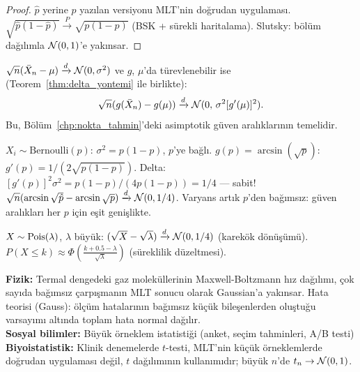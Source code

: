 \begin{proof}
$\hat{p}$ yerine $p$ yazılan versiyonu MLT'nin doğrudan uygulaması.
$\sqrt{\hat{p}(1-\hat{p})} \xrightarrow{P} \sqrt{p(1-p)}$ (BSK + sürekli haritalama).
Slutsky: bölüm dağılımla $\mathcal{N}(0,1)$'e yakınsar.
\end{proof}

\begin{teorem}
\label{thm:delta_mlt}
$\sqrt{n}(\bar{X}_n - \mu) \xrightarrow{d} \mathcal{N}(0,\sigma^2)$ ve $g$, $\mu$'da türevlenebilir ise
(Teorem~\ref{thm:delta_yontemi} ile birlikte):
\[
  \sqrt{n}(g(\bar{X}_n) - g(\mu)) \xrightarrow{d} \mathcal{N}(0,\, \sigma^2[g'(\mu)]^2).
\]
Bu, Bölüm~\ref{chp:nokta_tahmin}'deki asimptotik güven aralıklarının temelidir.
\end{teorem}

\begin{ornek}
$X_i \sim \mathrm{Bernoulli}(p)$: $\sigma^2 = p(1-p)$, $p$'ye bağlı.
$g(p) = \arcsin(\sqrt{p})$: $g'(p) = 1/(2\sqrt{p(1-p)})$.
Delta: $[g'(p)]^2 \sigma^2 = p(1-p)/(4p(1-p)) = 1/4$ --- sabit!
$\sqrt{n}(\arcsin\sqrt{\hat{p}} - \arcsin\sqrt{p}) \xrightarrow{d} \mathcal{N}(0, 1/4)$.
Varyans artık $p$'den bağımsız: güven aralıkları her $p$ için eşit genişlikte.
\end{ornek}

\begin{onerme}
$X \sim \operatorname{Pois}(\lambda)$, $\lambda$ büyük:
$(\sqrt{X} - \sqrt{\lambda}) \xrightarrow{d} \mathcal{N}(0, 1/4)$ (karekök dönüşümü).
$P(X \leq k) \approx \Phi\!\left(\frac{k+0.5-\lambda}{\sqrt{\lambda}}\right)$ (süreklilik düzeltmesi).
\end{onerme}

\begin{kopru}
\textbf{Fizik:} Termal dengedeki gaz moleküllerinin Maxwell-Boltzmann hız dağılımı,
çok sayıda bağımsız çarpışmanın MLT sonucu olarak Gaussian'a yakınsar.
Hata teorisi (Gauss): ölçüm hatalarının bağımsız küçük bileşenlerden oluştuğu
varsayımı altında toplam hata normal dağılır.\\
\textbf{Sosyal bilimler:} Büyük örneklem istatistiği (anket, seçim tahminleri, A/B testi)
\textbf{Biyoistatistik:} Klinik denemelerde $t$-testi, MLT'nin küçük örneklemlerde
doğrudan uygulaması değil, $t$ dağılımının kullanımıdır; büyük $n$'de $t_n \to \mathcal{N}(0,1)$.
\end{kopru}

